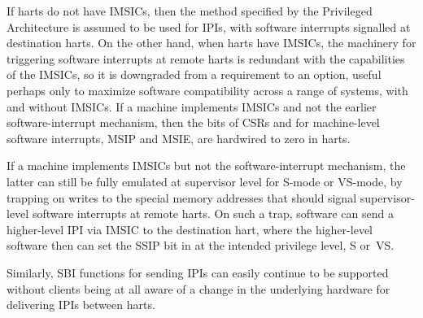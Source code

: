 If harts do not have IMSICs, then the method specified by the {\RISCV}
Privileged Architecture is assumed to be used for IPIs, with software
interrupts signalled at destination harts.
On the other hand, when harts have IMSICs, the machinery for triggering
software interrupts at remote harts is redundant with the capabilities
of the IMSICs, so it is downgraded from a requirement to an option,
useful perhaps only to maximize software compatibility across a range
of {\RISCV} systems, with and without IMSICs.
If a machine implements IMSICs and not the earlier software-interrupt
mechanism, then the bits of CSRs  and  for machine-level
software interrupts, MSIP and MSIE, are hardwired to zero in harts.

\begin{commentary}
If a machine implements IMSICs but not the software-interrupt
mechanism, the latter can still be fully emulated at supervisor level
for \mbox{S-mode} or \mbox{VS-mode}, by trapping on writes to the
special memory addresses that should signal supervisor-level software
interrupts at remote harts.
On such a trap, software can send a higher-level IPI via IMSIC to the
destination hart, where the higher-level software then can set the
SSIP bit in  at the intended privilege level, S or~VS.

Similarly, SBI functions for sending IPIs can easily continue to
be supported without clients being at all aware of a change in the
underlying hardware for delivering IPIs between harts.
\end{commentary}

